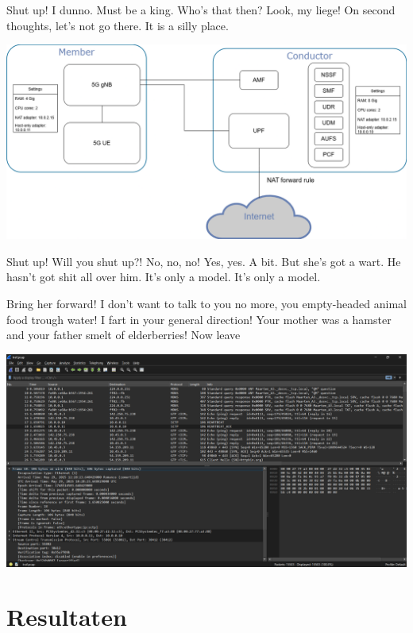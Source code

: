 \documentclass[a0,portrait]{hogent-poster}
\begin{document}
\begin{multicols}{2}
Shut up! I dunno. Must be a king. Who's that then? Look, my liege! On second thoughts, let's not go there. It is a silly place.


\begin{center}
  \captionsetup{type=figure}
  \includegraphics[width=1.0\linewidth]{./graphics/POC-setup.png}
\end{center}


Shut up! Will you shut up?! No, no, no! Yes, yes. A bit. But she's got a wart. He hasn't got shit all over him. It's only a model. It's only a model.

Bring her forward! I don't want to talk to you no more, you empty-headed animal food trough water! I fart in your general direction! Your mother was a hamster and your father smelt of elderberries! Now leave 

\begin{center}
  \captionsetup{type=figure}
  \includegraphics[width=1.0\linewidth]{./graphics/POC-wireshark.png}
\end{center}


\section{Resultaten}


\end{multicols}
\end{document}
